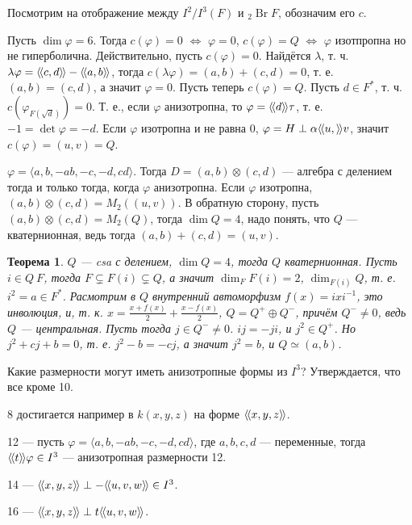 \documentclass{article}
\newtheorem*{theorem}{Теорема}
\theoremstyle{definition}
\theoremstyle{remark}
\DeclareMathOperator{\Br}{Br}
\newcommand{\llangle}{\langle \hspace{-.5mm} \langle}
\newcommand{\rrangle}{\rangle \hspace{-.5mm} \rangle}
\begin{document}
Посмотрим на отображение между $I^2/I^3(F)$ и ${}_2 \Br F$,  обозначим его $c$.

Пусть $\dim \varphi = 6$. Тогда $c(\varphi) = 0$ $\iff$ $\varphi = 0$, $c(\varphi) = Q$ $\iff$ $\varphi$ изотпропна но не гиперболична. Действительно, пусть $c(\varphi) = 0$. Найдётся $\lambda$, т. ч. $\lambda\varphi = \llangle c, d \rrangle - \llangle a, b \rrangle$, тогда $c(\lambda \varphi) = (a, b) + (c, d) = 0$, т. е. $(a, b) = (c, d)$, а значит $\varphi = 0$. Пусть теперь $c(\varphi) = Q$. Пусть $d \in F^*$, т. ч. $c(\varphi_{F(\sqrt{d})})= 0$. Т. е., если $\varphi$ анизотропна, то $\varphi = \llangle d \rrangle \tau$, т. е. $-1 = \det \varphi = -d$. Если $\varphi$ изотропна и не равна 0, $\varphi = H \perp \alpha \llangle u, \rrangle v$, значит $c(\varphi) = (u, v) = Q$.

$\varphi = \langle a, b, -ab, -c, -d, cd \rangle$. Тогда $D = (a, b) \otimes (c, d)$ --- алгебра с делением тогда и только тогда, когда $\varphi$ анизотропна. Если $\varphi$ изотропна, $(a, b) \otimes (c, d) = M_2((u, v))$. В обратную сторону, пусть $(a, b) \otimes (c, d) = M_2(Q)$, тогда $\dim Q = 4$, надо понять, что $Q$ --- кватернионная, ведь тогда $(a, b) + (c, d) = (u, v)$.

\begin{theorem}
    $Q$ --- csa с делением, $\dim Q = 4$, тогда $Q$ кватернионная. Пусть $i \in Q \ F$, тогда $F \subsetneq F(i) \subsetneq Q$, а значит $\dim_F F(i) = 2$, $\dim_{F(i)} Q$, т. е. $i^2 = a \in F^*$. Расмотрим в $Q$ внутренний автоморфизм $f(x) = ixi^{-1}$, это инволюция, и, т. к. $x = \frac{x + f(x)}{2} + \frac{x - f(x)}{2}$, $Q = Q^+ \oplus Q^-$, причём $Q^- \neq 0$, ведь $Q$ --- центральная. Пусть тогда $j \in Q^- \neq 0$. $ij = -ji$, и $j^2 \in Q^+$. Но $j^2 + cj + b = 0$, т. е. $j^2 - b = -cj$, а значит $j^2 = b$, и $Q \simeq (a, b)$.
\end{theorem}

Какие размерности могут иметь анизотропные формы из $I^3$? Утверждается, что все кроме 10.

8 достигается например в $k(x, y, z)$ на форме $\llangle x, y, z \rrangle$.

12 --- пусть $\varphi = \langle a, b, -ab, -c, -d, cd \rangle$, где $a, b, c, d$ --- переменные, тогда $\llangle t \rrangle \varphi \in I^3$ --- анизотропная размерности 12. 

14 --- $\llangle x, y, z \rrangle \perp -\llangle u, v, w \rrangle \in I^3$.

16 --- $\llangle x, y, z \rrangle \perp t \llangle u, v, w \rrangle$.
\end{document}
